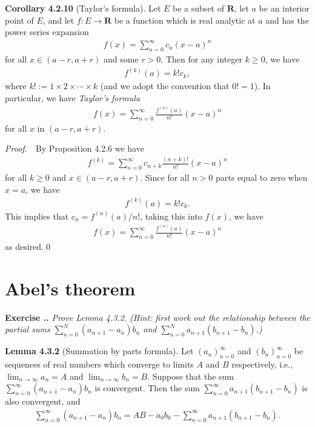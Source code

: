 \documentclass{book}
\newcommand{\pff}{\vspace{.25em}\noindent\emph{Proof.}~~}
\newcommand{\titl}[1]{\noindent\textbf{#1}}
\newcounter{Exercise}[section]
\renewcommand{\theExercise}{\thesection.\arabic{Exercise}.}
\newcommand{\new}{\vspace{1.5em}\noindent\textbf{Exercise \stepcounter{Exercise}\textbf{\theExercise}} }
\begin{document}
\begin{framed}
\titl{Corollary 4.2.10} (Taylor’s formula). Let $E$ be a subset of $\mathbf{R}$, let $a$ be an interior point of $E$, and let $f : E \to \mathbf{R}$ be a function which is real analytic at $a$ and has the power series expansion
    \begin{align*}
        f(x) = \sum_{n = 0}^{\infty} c_n(x - a)^n
    \end{align*}
for all $x \in (a - r, a + r)$ and some $r > 0$. Then for any integer $k \geq 0$, we have
    \begin{align*}
        f^{(k)}(a) = k!c_k,
    \end{align*}
where $k! := 1 \times 2 \times \cdots \times k$ (and we adopt the convention that $0! = 1$). In particular, we have \emph{Taylor's formula}
    \begin{align*}
        f(x) = \sum_{n = 0}^{\infty} \frac{f^{(n)}(a)}{n!}(x - a)^n
    \end{align*}
for all $x$ in $(a - r, a + r)$.
\end{framed}

\pff By Proposition 4.2.6 we have
    \begin{align*}
        f^{(k)} = \sum_{n = 0}^{\infty} c_{n + k}\frac{(n + k)!}{n!}(x - a)^n
    \end{align*}
for all $k \geq 0$ and $x \in (a - r, a + r)$. Since for all $n > 0$ parts equal to zero when $x = a$, we have
    \begin{align*}
        f^{(k)}(a) = k!c_k.
    \end{align*}
This implies that $c_n = f^{(n)}(a)/n!$, taking this into $f(x)$, we have
    \begin{align*}
        f(x) = \sum_{n = 0}^{\infty} \frac{f^{(n)}(a)}{n!}(x - a)^n
    \end{align*}
as desired.\qed

\section{Abel’s theorem}

\new\emph{Prove Lemma 4.3.2. (Hint: first work out the relationship between the partial sums $\sum_{n = 0}^{N} (a_{n + 1} - a_n)b_n$ and $\sum_{n = 0}^{N} a_{n + 1}(b_{n + 1} - b_n)$.)}

\begin{framed}
\titl{Lemma 4.3.2} (Summation by parts formula). Let $(a_n)_{n = 0}^{\infty}$ and $(b_n)_{n = 0}^{\infty}$ be sequences of real numbers which converge to limits $A$ and $B$ respectively, i.e., $\lim_{n \to \infty} a_n = A$ and $\lim_{n \to \infty} b_n = B$. Suppose that the sum $\sum_{n = 0}^{\infty} (a_{n + 1} - a_n)b_n$ is convergent. Then the sum $\sum_{n = 0}^{\infty} a_{n + 1}(b_{n + 1} - b_n)$ is also convergent, and
    \begin{align*}
        \sum_{n = 0}^{\infty} (a_{n + 1} - a_n)b_n 
        = AB - a_0b_0 - \sum_{n = 0}^{\infty} a_{n + 1}(b_{n + 1} - b_n).
    \end{align*}
\end{framed}
\end{document}
